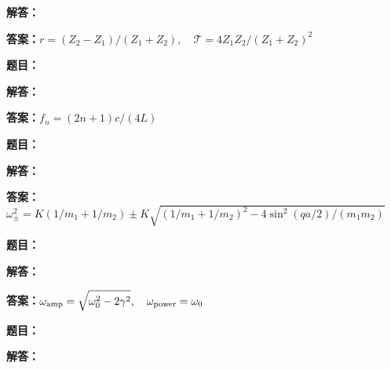\documentclass[lang=cn,color=blue,11pt]{elegantbook}
\begin{document}
\par\noindent\textbf{解答：}
\par\noindent\textbf{答案：}\(\displaystyle r=(Z_2-Z_1)/(Z_1+Z_2),\quad\mathcal T=4Z_1Z_2/(Z_1+Z_2)^2\)\par
\par\smallskip\noindent\hrulefill\par\medskip
{}\par
\noindent\textbf{题目：}
\par\noindent\textbf{解答：}
\par\noindent\textbf{答案：}\(\displaystyle f_n=(2n+1)c/(4L)\)\par
\par\smallskip\noindent\hrulefill\par\medskip
{}\par
\noindent\textbf{题目：}
\par\noindent\textbf{解答：}
\par\noindent\textbf{答案：}\(\displaystyle \omega_\pm^2=K(1/m_1+1/m_2)\pm K\sqrt{(1/m_1+1/m_2)^2-4\sin^2(qa/2)/(m_1m_2)}\)\par
\par\smallskip\noindent\hrulefill\par\medskip
{}\par
\noindent\textbf{题目：}
\par\noindent\textbf{解答：}
\par\noindent\textbf{答案：}\(\displaystyle \omega_{\rm amp}=\sqrt{\omega_0^2-2\gamma^2},\quad \omega_{\rm power}=\omega_0\)\par
\par\smallskip\noindent\hrulefill\par\medskip
{}\par
\noindent\textbf{题目：}
\par\noindent\textbf{解答：}
\end{document}
